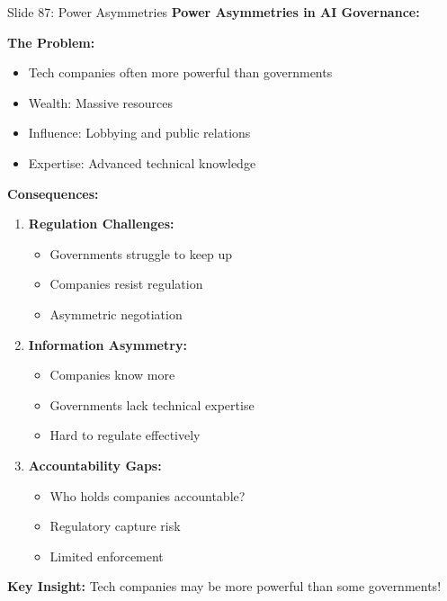 \documentclass[8pt]{beamer}
\begin{document}
	\begin{frame}{Slide 87: Power Asymmetries}
		\fontsize{6.5}{7.5}\selectfont
		\textbf{Power Asymmetries in AI Governance:}
		
		\vspace{0.1cm}
		\textbf{The Problem:}
		\begin{itemize}
			\item Tech companies often more powerful than governments
			\item Wealth: Massive resources
			\item Influence: Lobbying and public relations
			\item Expertise: Advanced technical knowledge
		\end{itemize}
		
		\vspace{0.1cm}
		\textbf{Consequences:}
		\begin{enumerate}
			\item \textbf{Regulation Challenges:}
			\begin{itemize}
				\item Governments struggle to keep up
				\item Companies resist regulation
				\item Asymmetric negotiation
			\end{itemize}
			\item \textbf{Information Asymmetry:}
			\begin{itemize}
				\item Companies know more
				\item Governments lack technical expertise
				\item Hard to regulate effectively
			\end{itemize}
			\item \textbf{Accountability Gaps:}
			\begin{itemize}
				\item Who holds companies accountable?
				\item Regulatory capture risk
				\item Limited enforcement
			\end{itemize}
		\end{enumerate}
		
		\textcolor{myblue}{\textbf{Key Insight:}} Tech companies may be \textcolor{myblue}{more powerful than some governments}!
	\end{frame}
	
\end{document}
